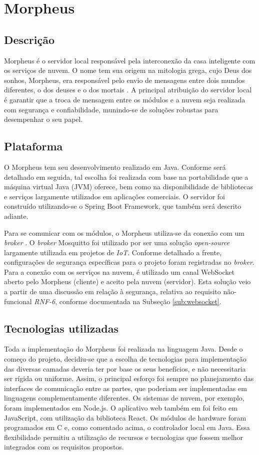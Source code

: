 \section{Morpheus \label{chap:morpheus}}

\subsection{Descrição}
Morpheus é o servidor local responsável pela interconexão da casa inteligente com os serviços de nuvem. O nome tem sua origem na mitologia grega, cujo Deus dos sonhos, Morpheus, era responsável pelo envio de mensagens entre dois mundos diferentes, o dos deuses e o dos mortais \cite{morpheusName}. A principal atribuição do servidor local é garantir que a troca de mensagem entre os módulos e a nuvem seja realizada com segurança e confiabilidade, munindo-se de soluções robustas para desempenhar o seu papel.

\subsection{Plataforma}
O Morpheus tem seu desenvolvimento realizado em Java. Conforme será detalhado em seguida, tal escolha foi realizada com base na portabilidade que a máquina virtual Java (JVM) oferece, bem como na disponibilidade de bibliotecas e serviços largamente utilizados em aplicações comerciais. O servidor foi construído utilizando-se o Spring Boot Framework, que também será descrito adiante.

Para se comunicar com os módulos, o Morpheus utiliza-se da conexão com um \emph{broker} \wmqtt{}. O \emph{broker} Mosquitto foi utilizado por ser uma solução \emph{open-source} largamente utilizada em projetos de \emph{IoT}. Conforme detalhado a frente, configurações de segurança específicas para o projeto foram registradas no \emph{broker}. Para a conexão com os serviços na nuvem, é utilizado um canal WebSocket aberto pelo Morpheus (cliente) e aceito pela nuvem (servidor). Esta solução veio a partir de uma discussão em relação à segurança, relativa ao requisito não-funcional \emph{RNF-6}, conforme documentada na Subseção \ref{sub:websocket}.

\subsection{Tecnologias utilizadas}
Toda a implementação do Morpheus foi realizada na linguagem Java. Desde o começo do projeto, decidiu-se que a escolha de tecnologias para implementação das diversas camadas deveria ter por base os seus benefícios, e não necessitaria ser rígida ou uniforme. Assim, o principal esforço foi sempre no planejamento das interfaces de comunicação entre as partes, que poderiam ser implementadas em linguagens complementamente diferentes. Os sistemas de nuvem, por exemplo, foram implementados em Node.js. O aplicativo web também em foi feito em JavaScript, com utilização da biblioteca React. Os módulos de hardware foram programados em C e, como comentado acima, o controlador local em Java. Essa flexibilidade permitiu a utilização de recursos e tecnologias que fossem melhor integrados com os requisitos propostos.

